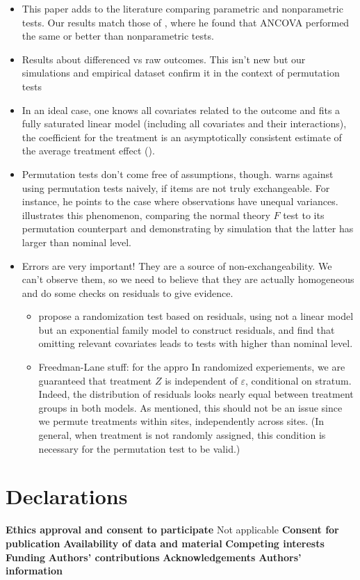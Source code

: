 \documentclass[11pt]{article}
\newcommand{\bit}{\begin{itemize}}
\newcommand{\eit}{\end{itemize}}
\newcommand{\todo}[1]{{\color{red}{TO DO: \sc #1}}}
\begin{document}
\bit
\item This paper adds to the literature comparing parametric and nonparametric tests.
Our results match those of \citet{vickers_parametric_2005}, where he found that ANCOVA performed the same or better than nonparametric tests.
\item Results about differenced vs raw outcomes. This isn't new but our simulations and empirical dataset confirm it in the context of permutation tests
\item In an ideal case, one knows all covariates related to the outcome and fits a fully saturated linear model (including all covariates and their interactions), the coefficient for the treatment is an asymptotically consistent estimate of the average treatment effect (\cite{lin_agnostic_2013}).
\item Permutation tests don't come free of assumptions, though.  \citet{romano_behavior_1990} warns against using permutation tests naively, if items are not truly exchangeable. For instance, he points to the case where observations have unequal variances.  \citet{boik_fisherpitman_1987} illustrates this phenomenon, comparing the normal theory $F$ test to its permutation counterpart and demonstrating by simulation that the latter has larger than nominal level.
\item Errors are very important!  They are a source of non-exchangeability.  We can't observe them, so we need to believe that they are actually homogeneous and do some checks on residuals to give evidence.
\bit
\item \citet{gail_tests_1988} propose a randomization test based on residuals, using not a linear model but an exponential family model to construct residuals, and find that omitting relevant covariates leads to tests with higher than nominal level.  \todo{perhaps this is something that one should be mindful of when using these linear model based tests.}
\item Freedman-Lane stuff: for the appro
In randomized experiements, we are guaranteed that treatment $Z$ is independent of $\varepsilon$, conditional on stratum.
Indeed, the distribution of residuals looks nearly equal between treatment groups in both models.
As mentioned, this should not be an issue since we permute treatments within sites, independently across sites.
(In general, when treatment is not randomly assigned, this condition is necessary for the permutation test to be valid.)
\eit
\eit



\section{Declarations}
\textbf{Ethics approval and consent to participate}
Not applicable
\textbf{Consent for publication}
\textbf{Availability of data and material}
\textbf{Competing interests}
\textbf{Funding}
\textbf{Authors' contributions}
\textbf{Acknowledgements}
\textbf{Authors' information}



\end{document}

